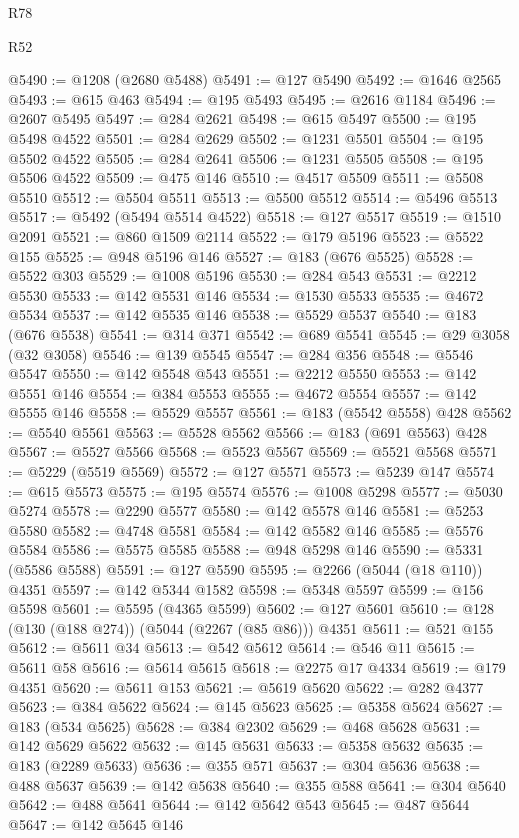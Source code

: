 \begin{lexlean}{R78}
\begin{lexlean}{R52}
\begin{coremodule}
{{{{{{{{{{{{{{{{{{{{{{{{{{{{{{{{{{{{{{{{{{{{{{{{{{{{{{{{{{{{{{{{{{{{{{{{{{{{{{{{{{{{{{{{{{{{{{{{{{{{{{{{{{{{{{{{{{{{{{{{{{{{{{{{{{{{{{{{{{{{{{{{{{{{{{{{{{{{{{{{{{{{{{{{{{{{{{{{{{{{{{{{{{{{{{{{{{{{{{@5490 := @1208 (@2680 @5488)
@5491 := @127 @5490
@5492 := @1646 @2565
@5493 := @615 @463
@5494 := @195 @5493
@5495 := @2616 @1184
@5496 := @2607 @5495
@5497 := @284 @2621
@5498 := @615 @5497
@5500 := @195 @5498 @4522
@5501 := @284 @2629
@5502 := @1231 @5501
@5504 := @195 @5502 @4522
@5505 := @284 @2641
@5506 := @1231 @5505
@5508 := @195 @5506 @4522
@5509 := @475 @146
@5510 := @4517 @5509
@5511 := @5508 @5510
@5512 := @5504 @5511
@5513 := @5500 @5512
@5514 := @5496 @5513
@5517 := @5492 (@5494 @5514 @4522)
@5518 := @127 @5517
@5519 := @1510 @2091
@5521 := @860 @1509 @2114
@5522 := @179 @5196
@5523 := @5522 @155
@5525 := @948 @5196 @146
@5527 := @183 (@676 @5525)
@5528 := @5522 @303
@5529 := @1008 @5196
@5530 := @284 @543
@5531 := @2212 @5530
@5533 := @142 @5531 @146
@5534 := @1530 @5533
@5535 := @4672 @5534
@5537 := @142 @5535 @146
@5538 := @5529 @5537
@5540 := @183 (@676 @5538)
@5541 := @314 @371
@5542 := @689 @5541
@5545 := @29 @3058 (@32 @3058)
@5546 := @139 @5545
@5547 := @284 @356
@5548 := @5546 @5547
@5550 := @142 @5548 @543
@5551 := @2212 @5550
@5553 := @142 @5551 @146
@5554 := @384 @5553
@5555 := @4672 @5554
@5557 := @142 @5555 @146
@5558 := @5529 @5557
@5561 := @183 (@5542 @5558) @428
@5562 := @5540 @5561
@5563 := @5528 @5562
@5566 := @183 (@691 @5563) @428
@5567 := @5527 @5566
@5568 := @5523 @5567
@5569 := @5521 @5568
@5571 := @5229 (@5519 @5569)
@5572 := @127 @5571
@5573 := @5239 @147
@5574 := @615 @5573
@5575 := @195 @5574
@5576 := @1008 @5298
@5577 := @5030 @5274
@5578 := @2290 @5577
@5580 := @142 @5578 @146
@5581 := @5253 @5580
@5582 := @4748 @5581
@5584 := @142 @5582 @146
@5585 := @5576 @5584
@5586 := @5575 @5585
@5588 := @948 @5298 @146
@5590 := @5331 (@5586 @5588)
@5591 := @127 @5590
@5595 := @2266 (@5044 (@18 @110)) @4351
@5597 := @142 @5344 @1582
@5598 := @5348 @5597
@5599 := @156 @5598
@5601 := @5595 (@4365 @5599)
@5602 := @127 @5601
@5610 := @128 (@130 (@188 @274)) (@5044 (@2267 (@85 @86))) @4351
@5611 := @521 @155
@5612 := @5611 @34
@5613 := @542 @5612
@5614 := @546 @11
@5615 := @5611 @58
@5616 := @5614 @5615
@5618 := @2275 @17 @4334
@5619 := @179 @4351
@5620 := @5611 @153
@5621 := @5619 @5620
@5622 := @282 @4377
@5623 := @384 @5622
@5624 := @145 @5623
@5625 := @5358 @5624
@5627 := @183 (@534 @5625)
@5628 := @384 @2302
@5629 := @468 @5628
@5631 := @142 @5629 @5622
@5632 := @145 @5631
@5633 := @5358 @5632
@5635 := @183 (@2289 @5633)
@5636 := @355 @571
@5637 := @304 @5636
@5638 := @488 @5637
@5639 := @142 @5638
@5640 := @355 @588
@5641 := @304 @5640
@5642 := @488 @5641
@5644 := @142 @5642 @543
@5645 := @487 @5644
@5647 := @142 @5645 @146
}}}}}}}}}}}}}}}}}}}}}}}}}}}}}}}}}}}}}}}}}}}}}}}}}}}}}}}}}}}}}}}}}}}}}}}}}}}}}}}}}}}}}}}}}}}}}}}}}}}}}}}}}}}}}}}}}}}}}}}}}}}}}}}}}}}}}}}}}}}}}}}}}}}}}}}}}}}}}}}}}}}}}}}}}}}}}}}}}}}}}}}}}}}}}}}}}}}}}}
\end{coremodule}
\end{lexlean}
\end{lexlean}
